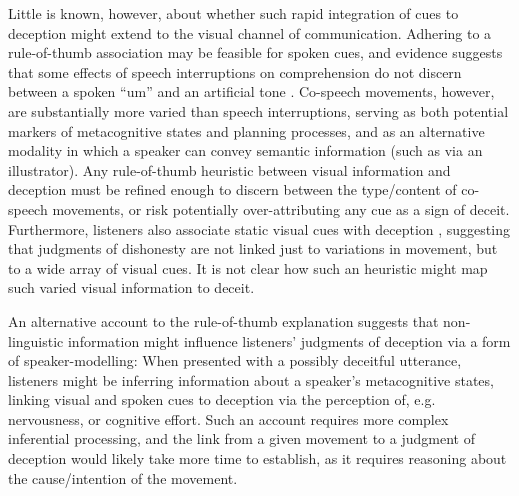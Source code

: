 \documentclass[a4paper,man,natbib]{apa6}
\newcommand*{\spex}[1]{``{#1}''} %
\begin{document}
Little is known, however, about whether such rapid integration of cues to deception might extend to the visual channel of communication. 
Adhering to a rule-of-thumb association may be feasible for spoken cues, and evidence suggests that some effects of speech interruptions on comprehension do not discern between a spoken \spex{um} and an artificial tone \citep{Corley2011}. %
Co-speech movements, however, are substantially more varied than speech interruptions, serving as both potential markers of metacognitive states and planning processes, and as an alternative modality in which a speaker can convey semantic information (such as via an illustrator). %
Any rule-of-thumb heuristic between visual information and deception must be refined enough to discern between the type/content of co-speech movements, or risk potentially over-attributing any cue as a sign of deceit.
Furthermore, listeners also associate static visual cues with deception \citep[e.g. eye-gaze,][]{Zuckerman1981a}, suggesting that judgments of dishonesty are not linked just to variations in movement, but to a wide array of visual cues. %
It is not clear how such an heuristic might map such varied visual information to deceit. %

An alternative account to the rule-of-thumb explanation suggests that non-linguistic information might influence listeners' judgments of deception via a form of speaker-modelling: %
When presented with a possibly deceitful utterance, listeners might be inferring information about a speaker's metacognitive states, linking visual and spoken cues to deception via the perception of, e.g. nervousness, or cognitive effort. 
Such an account requires more complex inferential processing, and the link from a given movement to a judgment of deception would likely take more time to establish, as it requires reasoning about the cause/intention of the movement. %
\end{document}
